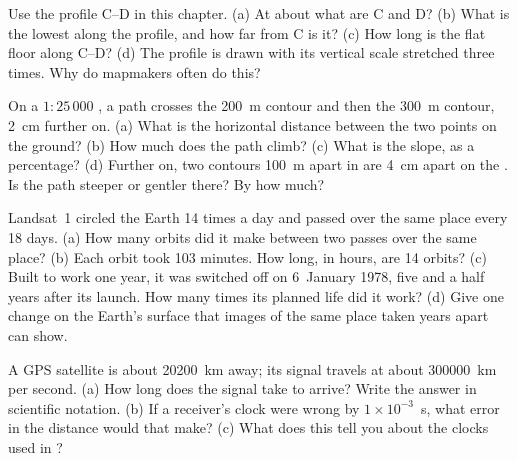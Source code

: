 \begin{exercise}[$\star\star$]\label{exo:g9:maps-of-the-earth:7}
Use the profile C--D in this chapter. (a) At about what  are C
and D? (b) What is the lowest  along the profile, and how far from
C is it? (c) How long is the flat  floor along C--D? (d) The profile
is drawn with its vertical scale stretched three times. Why do mapmakers
often do this?
\end{exercise}

\begin{exercise}[$\star\star$]\label{exo:g9:maps-of-the-earth:8}
On a $1 : 25\,000$ , a path crosses the \qty{200}{m} contour and then
the \qty{300}{m} contour, \qty{2}{cm} further on. (a) What is the
horizontal distance between the two points on the ground? (b) How much
does the path climb? (c) What is the slope, as a percentage? (d) Further
on, two contours \qty{100}{m} apart in  are \qty{4}{cm} apart on the
. Is the path steeper or gentler there? By how much?
\end{exercise}

\begin{exercise}[$\star\star$]\label{exo:g9:maps-of-the-earth:9}
Landsat~1 circled the Earth 14 times a day and passed over the same place
every 18 days. (a) How many orbits did it make between two passes over the
same place? (b) Each orbit took 103 minutes. How long, in hours, are 14
orbits? (c) Built to work one year, it was switched off on 6~January 1978,
five and a half years after its launch. How many times its planned life did
it work? (d) Give one change on the Earth's surface that images of the same
place taken years apart can show.
\end{exercise}

\begin{exercise}[$\star\star$]\label{exo:g9:maps-of-the-earth:10}
A GPS satellite is about \qty{20200}{km} away; its signal travels at
about \qty{300000}{km} per second. (a) How long does the signal take to
arrive? Write the answer in scientific notation. (b) If a receiver's
clock were wrong by $1 \times 10^{-3}$~s, what error in the distance would
that make? (c) What does this tell you about the clocks used in ?
\end{exercise}


